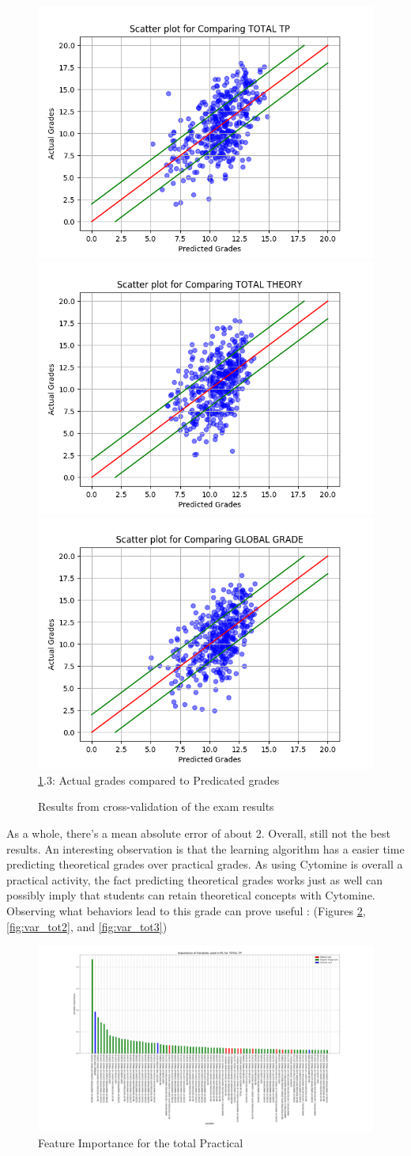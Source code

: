 \documentclass[a4paper,11pt]{report}
\numberwithin{figure}{section} %
\begin{document}
\begin{figure}[H]
      \includegraphics[width=.30\linewidth]{plots/cv_comp_TOTAL_TP_2018-04-27_19_24_46.png}
      \includegraphics[width=.30\linewidth]{plots/cv_comp_TOTAL_THEORY_2018-04-30_13_53_15.png}
  	  \includegraphics[width=.30\linewidth]{plots/cv_comp_GLOBAL_GRADE_2018-04-30_13_48_59.png}
      \\
      \ref{fig:results_tot}.3: Actual grades compared to Predicated grades
      \caption{Results from cross-validation of the exam results}
      \label{fig:results_tot}
    \end{figure}
    
    As a whole, there's a mean absolute error of about 2.
    Overall, still not the best results.
    An interesting observation is that the learning algorithm has a easier time predicting theoretical grades over practical grades.
    As using Cytomine is overall a practical activity, the fact predicting theoretical grades works just as well can possibly imply that students can retain theoretical concepts with Cytomine.\\

    Observing what behaviors lead to this grade can prove useful : (Figures \ref{fig:var_tot1}, \ref{fig:var_tot2}, and \ref{fig:var_tot3})

      \begin{figure}[H]
      \centering
      \includegraphics[width=.95\linewidth]{plots/var_importance_TOTAL_TP_2018-04-29_14_37_37.png}
      \caption{Feature Importance for the total Practical}
      \label{fig:var_tot1}
      \end{figure}
      
\end{document}
